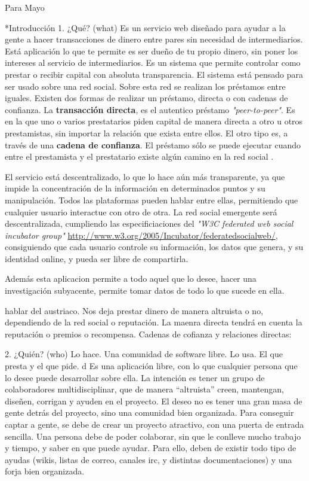 Para Mayo

*Introducción
1. ¿Qué? (what)
Es un servicio web diseñado para ayudar a la gente a hacer transacciones de dinero entre pares sin necesidad de intermediarios. Está aplicación lo que te permite es ser dueño de tu propio dinero, sin poner los intereses al servicio de intermediarios. Es un sistema que permite controlar como prestar o recibir capital con absoluta transparencia. El sistema está pensado para ser usado sobre una red social. Sobre esta red se realizan los préstamos entre iguales. Existen dos formas de realizar un préstamo, directa o con cadenas de confianza. La \textbf{transacción directa}, es el autentico préstamo \textit{"peer-to-peer"}. Es en la que uno o varios prestatarios piden capital de manera directa a otro u otros prestamistas, sin importar la relación que exista entre ellos. El otro tipo es, a través de una \textbf{cadena de confianza}. El préstamo sólo se puede ejecutar cuando entre el prestamista y el prestatario existe algún camino en la red social \cite{ripple}. 

El servicio está descentralizado, lo que lo hace aún más transparente, ya que impide la concentración de la información en determinados puntos y su manipulación. Todos las plataformas pueden hablar entre ellas, permitiendo que cualquier usuario interactue con otro de otra. La red social emergente será descentralizada, cumpliendo las especificiaciones del \textit{"W3C federated web social incubator group"} \url{http://www.w3.org/2005/Incubator/federatedsocialweb/}, consiguiendo que cada usuario controle su información, los datos que genera, y su identidad online, y pueda ser libre de compartirla. 

Además esta aplicacion permite a todo aquel que lo desee, hacer una investigación subyacente, permite tomar datos de todo lo que sucede en ella. 

hablar del austriaco. Nos deja prestar dinero de manera altruista o no, dependiendo de la red social o reputación. La maenra directa tendrá en cuenta la reputación o premios o recompensa. Cadenas de cofianza y relaciones directas:

2. ¿Quién? (who) 
Lo hace. Una comunidad de software libre.
Lo usa. El que presta y el que pide.
d
Es una aplicación libre, con lo que cualquier persona que lo desee puede desarrollar sobre ella. La intención es tener un grupo de colaboradores multidisciplinar, que de manera ``altruista'' creen, mantengan, diseñen, corrigan y ayuden en el proyecto. El deseo no es tener una gran masa de gente detrás del proyecto, sino una comunidad bien organizada. Para conseguir captar a gente, se debe de crear un proyecto atractivo, con una puerta de entrada sencilla. Una persona debe de poder colaborar, sin que le conlleve mucho trabajo y tiempo, y saber en que puede ayudar. Para ello, deben de existir todo tipo de ayudas (wikis, listas de correo, canales irc, y distintas documentaciones) y una forja bien organizada.

